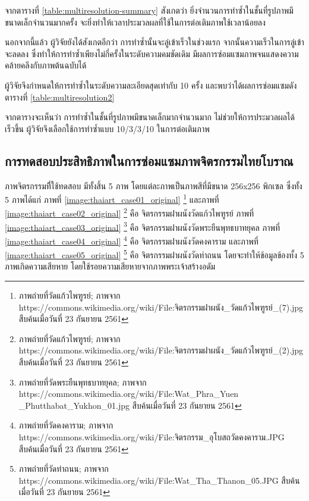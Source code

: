 


\hspace{1cm}จากตารางที่ \ref{table:multiresolution-summary} สังเกตว่า ยิ่งจำนวนการทำซ้ำในชั้นที่รูปภาพมีขนาดเล็กจำนวนมากครั้ง จะยิ่งทำให้เวลาประมวลผลที่ใช้ในการต่อเติมภาพใช้เวลาน้อยลง

\hspace{1cm} นอกจากนี้แล้ว ผู้วิจัยยังได้สังเกตอีกว่า การทำซ้ำนั้นจะลู่เข้าเร็วในช่วงแรก จากนั้นความเร็วในการลู่เข้าจะลดลง ซึ่งทำให้การทำซ้ำเพียงไม่กี่ครั้งในระดับความคมชัดเดิม  มีผลการซ่อมแซมภาพจนแสดงความคล้ายคลึงกับภาพต้นฉบับได้

\hspace{1cm} ผู้วิจัยจึงกำหนดให้การทำซ้ำในระดับความละเอียดสุดเท่ากับ 10 ครั้ง และพบว่าได้ผลการซ่อมแซมดังตารางที่ \ref{table:multiresolution2}




\hspace{1cm}จากตารางจะเห็นว่า การทำซ้ำในชั้นที่รูปภาพมีขนาดเล็กมากจำนวนมาก ไม่ช่วยให้การประมวลผลได้เร็วขึ้น ผู้วิจัยจึงเลือกใช้การทำซ้ำแบบ 10/3/3/10 ในการต่อเติมภาพ

\subsection{การทดสอบประสิทธิภาพในการซ่อมแซมภาพจิตรกรรมไทยโบราณ}

\hspace{1cm}ภาพจิตรกรรมทีี่ใช้ทดสอบ มีทั้งสิ้น 5  ภาพ โดยแต่ละภาพเป็นภาพสีที่มีขนาด 256x256 พิกเซล ซึ่งทั้ง 5 ภาพได้แก่ ภาพที่ \ref{image:thaiart_case01_original} \footnote{ภาพถ่ายที่วัดแก้วไพฑูรย์; ภาพจาก  https://commons.wikimedia.org/wiki/File:จิตรกรรมฝาผนัง\_วัดแก้วไพฑูรย์\_(7).jpg สืบค้นเมื่อวันที่ 23 กันยายน 2561}   และภาพที่ \ref{image:thaiart_case02_original} \footnote{ภาพถ่ายที่วัดแก้วไพฑูรย์; ภาพจาก  https://commons.wikimedia.org/wiki/File:จิตรกรรมฝาผนัง\_วัดแก้วไพฑูรย์\_(2).jpg สืบค้นเมื่อวันที่ 23 กันยายน 2561} คือ จิตรกรรมฝาผนังวัดแก้วไพฑูรย์ ภาพที่ \ref{image:thaiart_case03_original} \footnote{ภาพถ่ายที่วัดพระยืนพุทธบาทยุคล; ภาพจาก https://commons.wikimedia.org/wiki/File:Wat\_Phra\_Yuen \_Phutthabat\_Yukhon\_01.jpg สืบค้นเมื่อวันที่ 23 กันยายน 2561}  คือ จิตรกรรมฝาผนังวัดพระยืนพุทธบาทยุคล ภาพที่ \ref{image:thaiart_case04_original} \footnote{ภาพถ่ายที่วัดคงคาราม; ภาพจาก  https://commons.wikimedia.org/wiki/File:จิตรกรรม\_อุโบสถวัดคงคาราม.JPG สืบค้นเมื่อวันที่ 23 กันยายน 2561} คือ จิตรกรรมฝาผนังวัดคงคาราม และภาพที่ \ref{image:thaiart_case05_original} \footnote{ภาพถ่ายที่วัดท่าถนน; ภาพจาก  https://commons.wikimedia.org/wiki/File:Wat\_Tha\_Thanon\_05.JPG สืบค้นเมื่อวันที่ 23 กันยายน 2561} คือ จิตรกรรมฝาผนังวัดท่าถนน โดยจะทำให้ข้อมูลข้องทั้ง 5 ภาพเกิดความเสียหาย โดยใช้รอยความเสียหายจากภาพพระเจ้าสร้างอดัม
    
